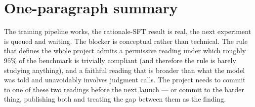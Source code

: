 \documentclass[11pt]{article}
\begin{document}
\section{One-paragraph summary}

The training pipeline works, the rationale-SFT result is real, the next
experiment is queued and waiting. The blocker is conceptual rather than
technical. The rule that defines the whole project admits a permissive
reading under which roughly $95\%$ of the benchmark is trivially compliant
(and therefore the rule is barely studying anything), and a faithful
reading that is broader than what the model was told and unavoidably
involves judgment calls. The project needs to commit to one of these two
readings before the next launch --- or commit to the harder thing,
publishing both and treating the gap between them as the finding.
\end{document}
